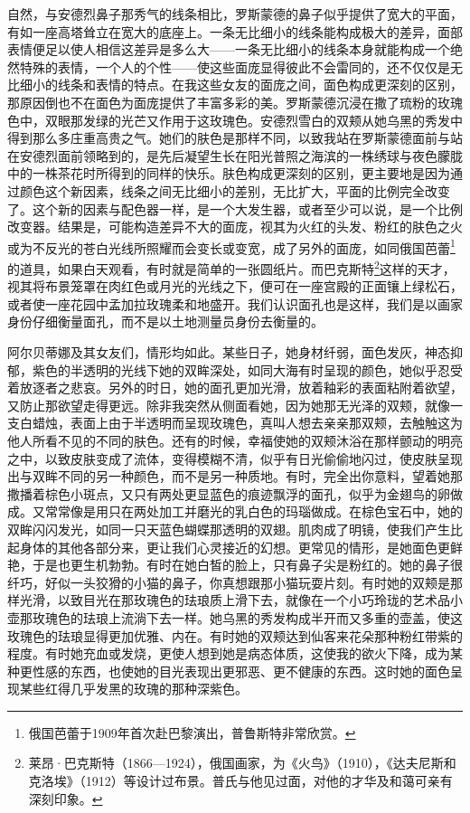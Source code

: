 \par 自然，与安德烈鼻子那秀气的线条相比，罗斯蒙德的鼻子似乎提供了宽大的平面，有如一座高塔耸立在宽大的底座上。一条无比细小的线条能构成极大的差异，面部表情便足以使人相信这差异是多么大——一条无比细小的线条本身就能构成一个绝然特殊的表情，一个人的个性——使这些面庞显得彼此不会雷同的，还不仅仅是无比细小的线条和表情的特点。在我这些女友的面庞之间，面色构成更深刻的区别，那原因倒也不在面色为面庞提供了丰富多彩的美。罗斯蒙德沉浸在撒了琉粉的玫瑰色中，双眼那发绿的光芒又作用于这玫瑰色。安德烈雪白的双颊从她乌黑的秀发中得到那么多庄重高贵之气。她们的肤色是那样不同，以致我站在罗斯蒙德面前与站在安德烈面前领略到的，是先后凝望生长在阳光普照之海滨的一株绣球与夜色朦胧中的一株茶花时所得到的同样的快乐。肤色构成更深刻的区别，更主要地是因为通过颜色这个新因素，线条之间无比细小的差别，无比扩大，平面的比例完全改变了。这个新的因素与配色器一样，是一个大发生器，或者至少可以说，是一个比例改变器。结果是，可能构造差异不大的面庞，视其为火红的头发、粉红的肤色之火或为不反光的苍白光线所照耀而会变长或变宽，成了另外的面庞，如同俄国芭蕾\footnote{俄国芭蕾于1909年首次赴巴黎演出，普鲁斯特非常欣赏。}的道具，如果白天观看，有时就是简单的一张圆纸片。而巴克斯特\footnote{莱昂·巴克斯特（1866—1924），俄国画家，为《火鸟》（1910），《达夫尼斯和克洛埃》（1912）等设计过布景。普氏与他见过面，对他的才华及和蔼可亲有深刻印象。}这样的天才，视其将布景笼罩在肉红色或月光的光线之下，便可在一座宫殿的正面镶上绿松石，或者使一座花园中孟加拉玫瑰柔和地盛开。我们认识面孔也是这样，我们是以画家身份仔细衡量面孔，而不是以土地测量员身份去衡量的。
\par 阿尔贝蒂娜及其女友们，情形均如此。某些日子，她身材纤弱，面色发灰，神态抑郁，紫色的半透明的光线下她的双眸深处，如同大海有时呈现的颜色，她似乎忍受着放逐者之悲哀。另外的时日，她的面孔更加光滑，放着釉彩的表面粘附着欲望，又防止那欲望走得更远。除非我突然从侧面看她，因为她那无光泽的双颊，就像一支白蜡烛，表面上由于半透明而呈现玫瑰色，真叫人想去亲亲那双颊，去触触这为他人所看不见的不同的肤色。还有的时候，幸福使她的双颊沐浴在那样颤动的明亮之中，以致皮肤变成了流体，变得模糊不清，似乎有日光偷偷地闪过，使皮肤呈现出与双眸不同的另一种颜色，而不是另一种质地。有时，完全出你意料，望着她那撒播着棕色小斑点，又只有两处更显蓝色的痕迹飘浮的面孔，似乎为金翅鸟的卵做成。又常常像是用只在两处加工并磨光的乳白色的玛瑙做成。在棕色宝石中，她的双眸闪闪发光，如同一只天蓝色蝴蝶那透明的双翅。肌肉成了明镜，使我们产生比起身体的其他各部分来，更让我们心灵接近的幻想。更常见的情形，是她面色更鲜艳，于是也更生机勃勃。有时在她白皙的脸上，只有鼻子尖是粉红的。她的鼻子很纤巧，好似一头狡猾的小猫的鼻子，你真想跟那小猫玩耍片刻。有时她的双颊是那样光滑，以致目光在那玫瑰色的珐琅质上滑下去，就像在一个小巧玲珑的艺术品小壶那玫瑰色的珐琅上流淌下去一样。她乌黑的秀发构成半开而又多重的壶盖，使这玫瑰色的珐琅显得更加优雅、内在。有时她的双颊达到仙客来花朵那种粉红带紫的程度。有时她充血或发烧，更使人想到她是病态体质，这使我的欲火下降，成为某种更性感的东西，也使她的目光表现出更邪恶、更不健康的东西。这时她的面色呈现某些红得几乎发黑的玫瑰的那种深紫色。
